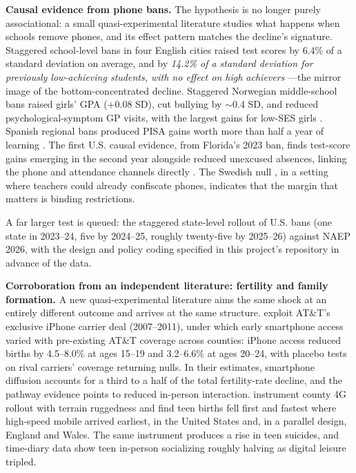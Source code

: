\documentclass[11pt]{article}
\begin{document}
\textbf{Causal evidence from phone bans.} The hypothesis is no longer purely associational: a small quasi-experimental literature studies what happens when schools remove phones, and its effect pattern matches the decline's signature. Staggered school-level bans in four English cities raised test scores by 6.4\% of a standard deviation on average, and by \emph{14.2\% of a standard deviation for previously low-achieving students, with no effect on high achievers} \citep{belandmurphy2016}---the mirror image of the bottom-concentrated decline. Staggered Norwegian middle-school bans raised girls' GPA (+0.08 SD), cut bullying by $\sim$0.4 SD, and reduced psychological-symptom GP visits, with the largest gains for low-SES girls \citep{abrahamsson2024}. Spanish regional bans produced PISA gains worth more than half a year of learning \citep{beneito2022}. The first U.S. causal evidence, from Florida's 2023 ban, finds test-score gains emerging in the second year alongside reduced unexcused absences, linking the phone and attendance channels directly \citep{figlio2025}. The Swedish null \citep{kessel2020}, in a setting where teachers could already confiscate phones, indicates that the margin that matters is binding restrictions.

A far larger test is queued: the staggered state-level rollout of U.S. bans (one state in 2023--24, five by 2024--25, roughly twenty-five by 2025--26) against NAEP 2026, with the design and policy coding specified in this project's repository in advance of the data.

\textbf{Corroboration from an independent literature: fertility and family formation.} A new quasi-experimental literature aims the same shock at an entirely different outcome and arrives at the same structure. \citet{myershooper2026} exploit AT\&T's exclusive iPhone carrier deal (2007--2011), under which early smartphone access varied with pre-existing AT\&T coverage across counties: iPhone access reduced births by 4.5--8.0\% at ages 15--19 and 3.2--6.6\% at ages 20--24, with placebo tests on rival carriers' coverage returning nulls. In their estimates, smartphone diffusion accounts for a third to a half of the total fertility-rate decline, and the pathway evidence points to reduced in-person interaction. \citet{hudsonmoscoso2026} instrument county 4G rollout with terrain ruggedness and find teen births fell first and fastest where high-speed mobile arrived earliest, in the United States and, in a parallel design, England and Wales. The same instrument produces a rise in teen suicides, and time-diary data show teen in-person socializing roughly halving as digital leisure tripled.
\end{document}
